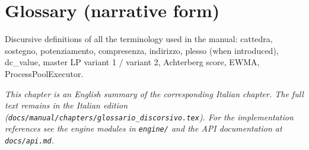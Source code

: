 \chapter{Glossary (narrative form)}
\label{ch:glossario_discorsivo_en}

Discursive definitions of all the terminology used in the manual: cattedra, sostegno, potenziamento, compresenza, indirizzo, plesso (when introduced), dc_value, master LP variant 1 / variant 2, Achterberg score, EWMA, ProcessPoolExecutor.

\medskip
\noindent
\textit{This chapter is an English summary of the corresponding Italian chapter. The full text remains in the Italian edition (\texttt{docs/manual/chapters/glossario\_discorsivo.tex}). For the implementation references see the engine modules in \texttt{engine/} and the API documentation at \texttt{docs/api.md}.}
